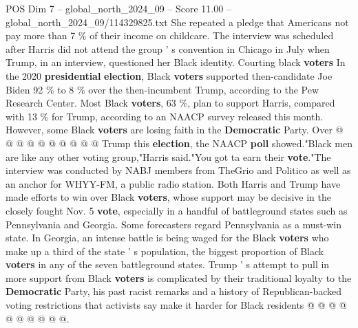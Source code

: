 \begin{textsample}{POS Dim 7 – global\_north\_2024\_09 – Score 11.00 – global\_north\_2024\_09/114329825.txt}
She repeated a pledge that Americans not pay more than 7 \% of their income on childcare.
The interview was scheduled after Harris did not attend the group ' s convention in Chicago in July when Trump, in an interview, questioned her Black identity.
Courting black \textbf{voters} In the 2020 \textbf{presidential} \textbf{election}, Black \textbf{voters} supported then-candidate Joe Biden 92 \% to 8 \% over the then-incumbent Trump, according to the Pew Research Center.
Most Black \textbf{voters}, 63 \%, plan to support Harris, compared with 13 \% for Trump, according to an NAACP survey released this month.
However, some Black \textbf{voters} are losing faith in the \textbf{Democratic} Party.
Over @ @ @ @ @ @ @ @ @ @ Trump this \textbf{election}, the NAACP \textbf{poll} showed."Black men are like any other voting group,"Harris said."You got ta earn their \textbf{vote}."The interview was conducted by NABJ members from TheGrio and Politico as well as an anchor for WHYY-FM, a public radio station.
Both Harris and Trump have made efforts to win over Black \textbf{voters}, whose support may be decisive in the closely fought Nov. 5 \textbf{vote}, especially in a handful of battleground states such as Pennsylvania and Georgia.
Some forecasters regard Pennsylvania as a must-win state.
In Georgia, an intense battle is being waged for the Black \textbf{voters} who make up a third of the state ' s population, the biggest proportion of Black \textbf{voters} in any of the seven battleground states.
Trump ' s attempt to pull in more support from Black \textbf{voters} is complicated by their traditional loyalty to the \textbf{Democratic} Party, his past racist remarks and a history of Republican-backed voting restrictions that activists say make it harder for Black residents @ @ @ @ @ @ @ @ @ @.

\end{textsample}
